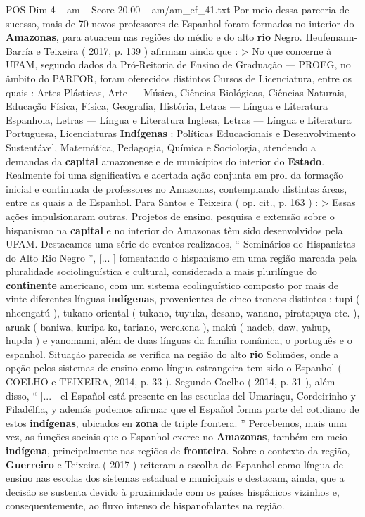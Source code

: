 \begin{textsample}{POS Dim 4 – am – Score 20.00 – am/am\_ef\_41.txt}
Por meio dessa parceria de sucesso, mais de 70 novos professores de Espanhol foram formados no interior do \textbf{Amazonas}, para atuarem nas regiões do médio e do alto \textbf{rio} Negro.
Heufemann-Barría e Teixeira ( 2017, p. 139 ) afirmam ainda que : > No que concerne à UFAM, segundo dados da Pró-Reitoria de Ensino de Graduação — PROEG, no âmbito do PARFOR, foram oferecidos distintos Cursos de Licenciatura, entre os quais : Artes Plásticas, Arte — Música, Ciências Biológicas, Ciências Naturais, Educação Física, Física, Geografia, História, Letras — Língua e Literatura Espanhola, Letras — Língua e Literatura Inglesa, Letras — Língua e Literatura Portuguesa, Licenciaturas \textbf{Indígenas} : Políticas Educacionais e Desenvolvimento Sustentável, Matemática, Pedagogia, Química e Sociologia, atendendo a demandas da \textbf{capital} amazonense e de municípios do interior do \textbf{Estado}.
Realmente foi uma significativa e acertada ação conjunta em prol da formação inicial e continuada de professores no Amazonas, contemplando distintas áreas, entre as quais a de Espanhol.
Para Santos e Teixeira ( op. cit., p. 163 ) : > Essas ações impulsionaram outras.
Projetos de ensino, pesquisa e extensão sobre o hispanismo na \textbf{capital} e no interior do Amazonas têm sido desenvolvidos pela UFAM.
Destacamos uma série de eventos realizados, “ Seminários de Hispanistas do Alto Rio Negro ”, [... ] fomentando o hispanismo em uma região marcada pela pluralidade sociolinguística e cultural, considerada a mais plurilíngue do \textbf{continente} americano, com um sistema ecolinguístico composto por mais de vinte diferentes línguas \textbf{indígenas}, provenientes de cinco troncos distintos : tupi ( nheengatú ), tukano oriental ( tukano, tuyuka, desano, wanano, piratapuya etc. ), aruak ( baniwa, kuripa-ko, tariano, werekena ), makú ( nadeb, daw, yahup, hupda ) e yanomami, além de duas línguas da família românica, o português e o espanhol.
Situação parecida se verifica na região do alto \textbf{rio} Solimões, onde a opção pelos sistemas de ensino como língua estrangeira tem sido o Espanhol ( COELHO e TEIXEIRA, 2014, p. 33 ).
Segundo Coelho ( 2014, p. 31 ), além disso, “ [... ] el Español está presente en las escuelas del Umariaçu, Cordeirinho y Filadélfia, y además podemos afirmar que el Español forma parte del cotidiano de estos \textbf{indígenas}, ubicados en \textbf{zona} de triple frontera. ” Percebemos, mais uma vez, as funções sociais que o Espanhol exerce no \textbf{Amazonas}, também em meio \textbf{indígena}, principalmente nas regiões de \textbf{fronteira}.
Sobre o contexto da região, \textbf{Guerreiro} e Teixeira ( 2017 ) reiteram a escolha do Espanhol como língua de ensino nas escolas dos sistemas estadual e municipais e destacam, ainda, que a decisão se sustenta devido à proximidade com os países hispânicos vizinhos e, consequentemente, ao fluxo intenso de hispanofalantes na região.

\end{textsample}
